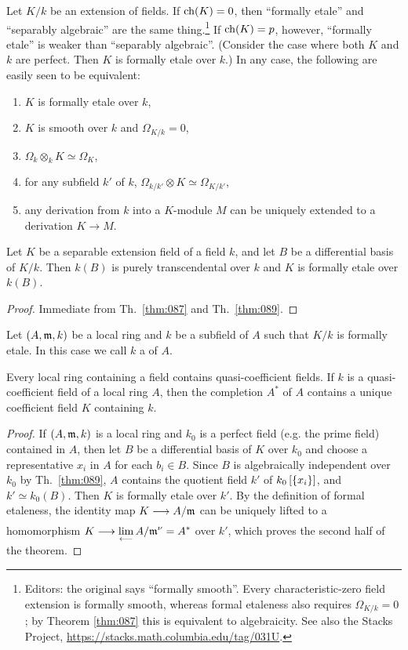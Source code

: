 \documentclass[../main]{subfiles}
\begin{document}
Let $K/k$ be an extension of fields. If $\operatorname{ch}(K)=0$, then ``formally etale'' and ``separably algebraic'' are the same thing.\footnote{Editors: the original says ``formally smooth''. Every characteristic-zero field extension is formally smooth, whereas formal etaleness also requires $\Omega_{K/k}=0$; by Theorem \ref{thm:087} this is equivalent to algebraicity. See also the Stacks Project, \url{https://stacks.math.columbia.edu/tag/031U}.} If $\operatorname{ch}(K)=p$, however, ``formally etale'' is weaker than ``separably algebraic''. (Consider the case where both $K$ and $k$ are perfect. Then $K$ is formally etale over $k$.) In any case, the following are easily seen to be equivalent:
\begin{enumerate}
    \item[(1)] $K$ is formally etale over $k$, 
    \item[(2)] $K$ is smooth over $k$ and $\Omega_{K/k}=0$,
    \item[(3)] $\Omega_k\otimes_k K\simeq \Omega_K$,
    \item[(4)] for any subfield $k'$ of $k$, $\Omega_{k/k'}\otimes K\simeq\Omega_{K/k'}$,
    \item[(5)] any derivation from $k$ into a $K$-module $M$ can be uniquely extended to a derivation $K\longrightarrow M$.
\end{enumerate}
\begin{theorem}
\label{thm:090}
    Let $K$ be a separable extension field of a field $k$, and let $B$ be a differential basis of $K/k$. Then $k(B)$ is purely transcendental over $k$ and $K$ is formally etale over $k(B)$. 
\end{theorem}
\begin{proof}
    Immediate from Th.~\ref{thm:087} and Th.~\ref{thm:089}.
\end{proof}

\newparagraph
Let $(A,\mathfrak{m}, k)$ be a local ring and $k$ be a subfield of $A$ such that $K/k$ is formally etale. In this case we call $k$ a  of $A$. 

\begin{theorem}
\label{thm:091}
    Every local ring containing a field contains quasi-coefficient fields. If $k$ is a quasi-coefficient field of a local ring $A$, then the completion $A^\ast$ of $A$ contains a unique coefficient field $K$ containing $k$. 
\end{theorem}
\begin{proof}
    If $(A,\mathfrak{m},k)$ is a local ring and $k_0$ is a perfect field (e.g. the prime field) contained in $A$, then let $B$ be a differential basis of $K$ over $k_0$ and choose a representative $x_i$ in $A$ for each $b_i \in B$. Since $B$ is algebraically independent over $k_0$ by Th.~\ref{thm:089}, $A$ contains the quotient field $k'$ of $k_0\left[\left\{x_i\right\}\right]$, and $k' \simeq k_0(B)$. Then $K$ is formally etale over $k'$. By the definition of formal etaleness, the identity map $K \varrightarrow{} A/\ideal{m}$ can be uniquely lifted to a homomorphism $K \varrightarrow{} \displaystyle\lim_{\longleftarrow} A/\ideal{m}^\nu = A^\ast$ over $k'$, which proves the second half of the theorem. 
\end{proof}
\end{document}
